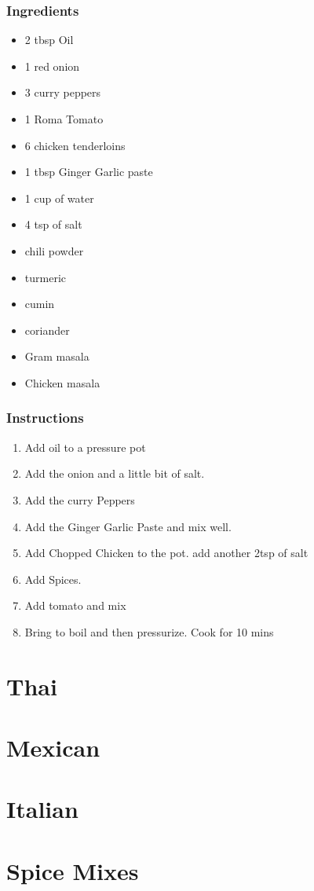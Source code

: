 \documentclass[11pt]{article}
\begin{document}
\subsubsection*{Ingredients}
\label{sec:orgb3e89da}
\begin{itemize}
\item 2 tbsp Oil
\item 1 red onion
\item 3 curry peppers
\item 1 Roma Tomato
\item 6 chicken tenderloins
\item 1 tbsp Ginger Garlic paste
\item 1 cup of water
\item 4 tsp of salt
\item chili powder
\item turmeric
\item cumin
\item coriander
\item Gram masala
\item Chicken masala
\end{itemize}
\subsubsection*{Instructions}
\label{sec:orgdcc3cb3}
\begin{enumerate}
\item Add oil to a pressure pot
\item Add the onion and a little bit of salt.
\item Add the curry Peppers
\item Add the Ginger Garlic Paste and mix well.
\item Add Chopped Chicken to the pot. add another 2tsp of salt
\item Add Spices.
\item Add tomato and mix
\item Bring to boil and then pressurize. Cook for 10  mins
\end{enumerate}

\section{Thai}
\label{sec:org44c5a91}
\section{Mexican}
\label{sec:orga5c927a}
\section{Italian}
\label{sec:orgc3f7855}
\section{Spice Mixes}
\label{sec:org9e8d54e}
\end{document}
